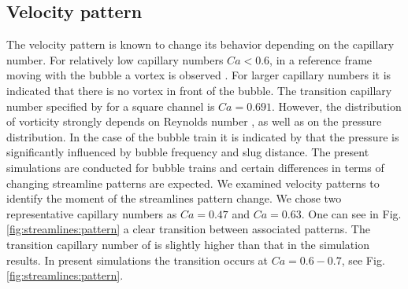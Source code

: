 \documentclass[preprint,12pt]{elsarticle}
\begin{document}
\subsection{Velocity pattern}
\label{sec:velocity}
The velocity pattern is known to change its behavior depending on the capillary number. For
relatively low capillary numbers $Ca<0.6$, in a reference frame moving with the bubble a vortex 
is observed \cite{heil-threedim}. For larger capillary numbers it is indicated that there is no
vortex in front of the bubble. The transition capillary number specified by
\citet{heil-threedim} for a square channel is $Ca=0.691$. However, the
distribution of vorticity strongly depends on Reynolds number \cite{heil-bretherton}, as well as on
the
pressure distribution. In the case of the bubble train it is indicated by \citet{kreutzer-taylor}
that the pressure is significantly influenced by bubble frequency and slug distance. The present
simulations are conducted for bubble trains and certain differences in terms of changing streamline
patterns are expected. We examined velocity patterns to identify the moment of the streamlines
pattern change. We chose two
representative capillary numbers as $Ca=0.47$ and $Ca=0.63$. 
One can
see in Fig. \ref{fig:streamlines:pattern} a clear transition between associated patterns. The
transition capillary number of
\citet{heil-threedim} is slightly higher than that in the simulation results. In present simulations
the                                               
transition occurs at $Ca=0.6-0.7$, see Fig. \ref{fig:streamlines:pattern}.
\end{document}
